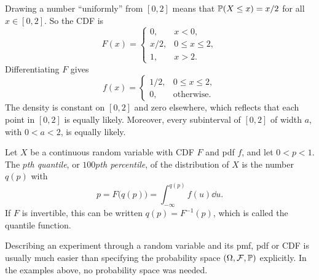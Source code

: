 \begin{solution}
Drawing a number ``uniformly'' from $[0, 2]$ means that $\mathbb{P}(X \le x) = x/2$ for all $x \in [0, 2]$. So the CDF is
\[
  F(x) = \begin{cases} 0, & x < 0, \\ x/2, & 0 \le x \le 2, \\ 1, & x > 2. \end{cases}
\]
Differentiating $F$ gives
\[
  f(x) = \begin{cases} 1/2, & 0 \le x \le 2, \\ 0, & \text{otherwise}. \end{cases}
\]
The density is constant on $[0, 2]$ and zero elsewhere, which reflects that each point in $[0, 2]$ is equally likely. Moreover, every subinterval of $[0, 2]$ of width $a$, with $0 < a < 2$, is equally likely.
\end{solution}

\begin{definition}\label{def:quantiles}
Let $X$ be a continuous random variable with CDF $F$ and pdf $f$, and let $0 < p < 1$. The \emph{$p$th quantile}, or \emph{$100p$th percentile}, of the distribution of $X$ is the number $q(p)$ with
\[
  p = F\bigl(q(p)\bigr) = \int_{-\infty}^{q(p)} f(u) \dd u.
\]
If $F$ is invertible, this can be written $q(p) = F^{-1}(p)$, which is called the quantile function.
\end{definition}

Describing an experiment through a random variable and its pmf, pdf or CDF is usually much easier than specifying the probability space $(\Omega, \mathcal{F}, \mathbb{P})$ explicitly. In the examples above, no probability space was needed.
